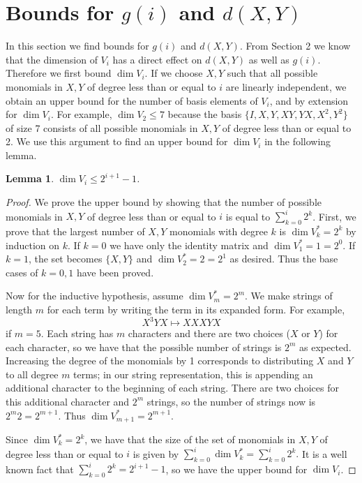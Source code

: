 \documentclass[11pt]{amsart}
\newtheorem{lemma}[theorem]{Lemma}
\numberwithin{equation}{section}
\numberwithin{figure}{section}
\numberwithin{theorem}{section}
\begin{document}
\section{Bounds for $g(i)$ and $d(X,Y)$}
In this section we find bounds for $g(i)$ and $d(X,Y)$. From Section 2 we know that the dimension of $V_i$ has a direct effect on $d(X,Y)$ as well as $g(i)$. Therefore we first bound $\dim V_i$. If we choose $X,Y$ such that all possible monomials in $X,Y$ of degree less than or equal to $i$ are linearly independent, we obtain an upper bound for the number of basis elements of $V_i$, and by extension for $\dim V_i$. For example, $\dim V_2\leq7$ because the basis $\{I,X,Y,XY,YX,X^2,Y^2\}$ of size 7 consists of all possible monomials in $X,Y$ of degree less than or equal to 2. We use this argument to find an upper bound for $\dim V_i$ in the following lemma. 
\begin{lemma}
$\dim V_i\leq2^{i+1}-1$. 
\end{lemma}
\begin{proof}
We prove the upper bound by showing that the number of possible monomials in $X,Y$ of degree less than or equal to $i$ is equal to $\sum_{k=0}^i2^k$. First, we prove that the largest number of $X,Y$ monomials with degree $k$ is $\dim V^*_k=2^k$ by induction on $k$. If $k=0$ we have only the identity matrix and $\dim V^*_1=1=2^0$. If $k=1$, the set becomes $\{X,Y\}$ and $\dim V^*_2=2=2^1$ as desired. Thus the base cases of $k=0,1$ have been proved. 

Now for the inductive hypothesis, assume $\dim V^*_m=2^m$. We make strings of length $m$ for each term by writing the term in its expanded form. For example, $$X^3YX\mapsto XXXYX$$ if $m=5$. Each string has $m$ characters and there are two choices ($X$ or $Y$) for each character, so we have that the possible number of strings is $2^m$ as expected. Increasing the degree of the monomials by 1 corresponds to distributing $X$ and $Y$ to all degree $m$ terms; in our string representation, this is appending an additional character to the beginning of each string. There are two choices for this additional character and $2^m$ strings, so the number of strings now is $2^m2=2^{m+1}$. Thus $\dim V^*_{m+1}=2^{m+1}$.

Since $\dim V^*_k=2^k$, we have that the size of the set of monomials in $X,Y$ of degree less than or equal to $i$ is given by $\sum_{k=0}^i\dim V^*_k=\sum_{k=0}^i2^k.$ It is a well known fact that $\sum_{k=0}^i2^k=2^{i+1}-1$, so we have the upper bound for $\dim V_i$. 
\end{proof}
\end{document}
